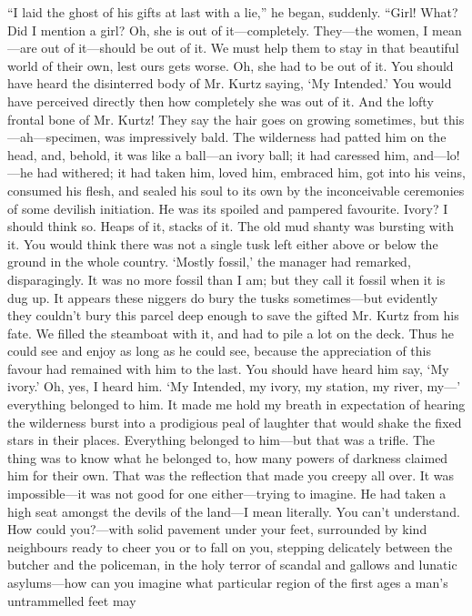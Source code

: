\documentclass[12pt]{report}
\begin{document}
``I laid the ghost of his gifts at last with a lie,'' he began,
suddenly. ``Girl! What? Did I mention a girl? Oh, she is out of
it---completely. They---the women, I mean---are out of it---should be
out of it. We must help them to stay in that beautiful world of their
own, lest ours gets worse. Oh, she had to be out of it. You should have
heard the disinterred body of Mr. Kurtz saying, `My Intended.' You would
have perceived directly then how completely she was out of it. And the
lofty frontal bone of Mr. Kurtz! They say the hair goes on growing
sometimes, but this---ah---specimen, was impressively bald. The
wilderness had patted him on the head, and, behold, it was like a
ball---an ivory ball; it had caressed him, and---lo!---he had withered;
it had taken him, loved him, embraced him, got into his veins, consumed
his flesh, and sealed his soul to its own by the inconceivable
ceremonies of some devilish initiation. He was its spoiled and pampered
favourite. Ivory? I should think so. Heaps of it, stacks of it. The old
mud shanty was bursting with it. You would think there was not a single
tusk left either above or below the ground in the whole country. `Mostly
fossil,' the manager had remarked, disparagingly. It was no more fossil
than I am; but they call it fossil when it is dug up. It appears these
niggers do bury the tusks sometimes---but evidently they couldn't bury
this parcel deep enough to save the gifted Mr. Kurtz from his fate. We
filled the steamboat with it, and had to pile a lot on the deck. Thus he
could see and enjoy as long as he could see, because the appreciation of
this favour had remained with him to the last. You should have heard him
say, `My ivory.' Oh, yes, I heard him. `My Intended, my ivory, my
station, my river, my---' everything belonged to him. It made me hold my
breath in expectation of hearing the wilderness burst into a prodigious
peal of laughter that would shake the fixed stars in their places.
Everything belonged to him---but that was a trifle. The thing was to
know what he belonged to, how many powers of darkness claimed him for
their own. That was the reflection that made you creepy all over. It was
impossible---it was not good for one either---trying to imagine. He had
taken a high seat amongst the devils of the land---I mean literally. You
can't understand. How could you?---with solid pavement under your feet,
surrounded by kind neighbours ready to cheer you or to fall on you,
stepping delicately between the butcher and the policeman, in the holy
terror of scandal and gallows and lunatic asylums---how can you imagine
what particular region of the first ages a man's untrammelled feet may
\end{document}
